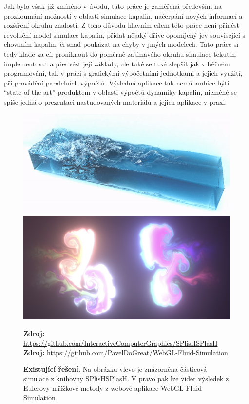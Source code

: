 Jak bylo však již zmíněno v úvodu, tato práce je zaměřená především na prozkoumání možností v oblasti simulace kapalin, načerpání nových informací a rozšíření okruhu znalostí. Z toho důvodu hlavním cílem této práce není přinést revoluční model simulace kapalin, přidat nějaký dříve opomíjený jev související s chováním kapalin, či snad poukázat na chyby v jiných modelech. Tato práce si tedy klade za cíl proniknout do poměrně zajímavého okruhu simulace tekutin, implementovat a předvést její základy, ale také se také zlepšit jak v běžném programování, tak v práci s grafickými výpočetními jednotkami a jejich využití, při provádění paralelních výpočtů. Výsledná aplikace tak nemá ambice býti \enquote{state-of-the-art} produktem v oblasti výpočtů dynamiky kapalin, nicméně se spíše jedná o prezentaci nastudovaných materiálů a jejich aplikace v praxi.

\begin{figure}[h]\centering
	\centering
	\captionsetup{justification=centering}
	\includegraphics[width=0.5\linewidth]{obrazky-figures/splish-0.png}\hfill
	\includegraphics[width=0.5\linewidth]{obrazky-figures/webglFluid.jpg}\hfill
	\caption{\textbf{Existující řešení.} Na obrázku vlevo je znázorněna částicová simulace z knihovny SPlisHSPlasH. V pravo pak lze videt výsledek z Eulerovy mřížkové metody z webové aplikace WebGL Fluid Simulation }
	\textbf{Zdroj: } \url{https://github.com/InteractiveComputerGraphics/SPlisHSPlasH} \newline
    \textbf{Zdroj: } \url{https://github.com/PavelDoGreat/WebGL-Fluid-Simulation}
	\label{fig:existingSolution}
\end{figure}

